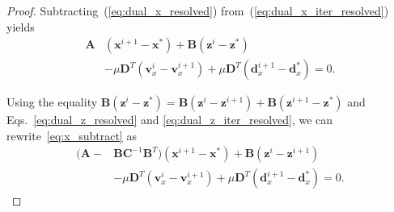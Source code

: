 \documentclass[10pt,twocolumn,twoside]{IEEEtran}
\newcommand{\x}{\mathbf{x}} %
\newcommand{\z}{\mathbf{z}} %
\newcommand{\vs}{\mathbf{v}} %
\newcommand{\dv}{\mathbf{d}} %
\newcommand{\D}{\mathbf{D}} %
\newcommand{\A}{\mathbf{A}} %
\newcommand{\B}{\mathbf{B}} %
\newcommand{\C}{\mathbf{C}} %
\begin{document}
\begin{proof}
	Subtracting~(\ref{eq:dual_x_resolved}) from~(\ref{eq:dual_x_iter_resolved}) yields
	\begin{equation} \label{eq:x_subtract}
	\begin{aligned}
	\A &(\x^{i+1} - \x^*) + \B (\z^i - \z^* ) \\
	& - \mu \D^T (\vs_x^i - \vs_x^{i+1}) + \mu \D^T (\dv_x^{i+1} - \dv_x^*)= 0.
	\end{aligned}
	\end{equation}

	Using the equality $\B (\z^i - \z^*) = \B (\z^i - \z^{i+1}) + \B (\z^{i+1} - \z^*)$ and Eqs.~\eqref{eq:dual_z_resolved} and \eqref{eq:dual_z_iter_resolved}, we can rewrite~\eqref{eq:x_subtract} as
	\begin{equation} \label{eq:x_subtract2}
	\begin{aligned}
	( \A - &\B \C^{-1} \B^T ) (\x^{i+1} - \x^*) + \B (\z^i - \z^{i+1}) \\
	& - \mu \D^T (\vs_x^i - \vs_x^{i+1}) + \mu \D^T (\dv_x^{i+1} - \dv_x^*)= 0.
	\end{aligned}
	\end{equation}


\end{proof}
\end{document}
